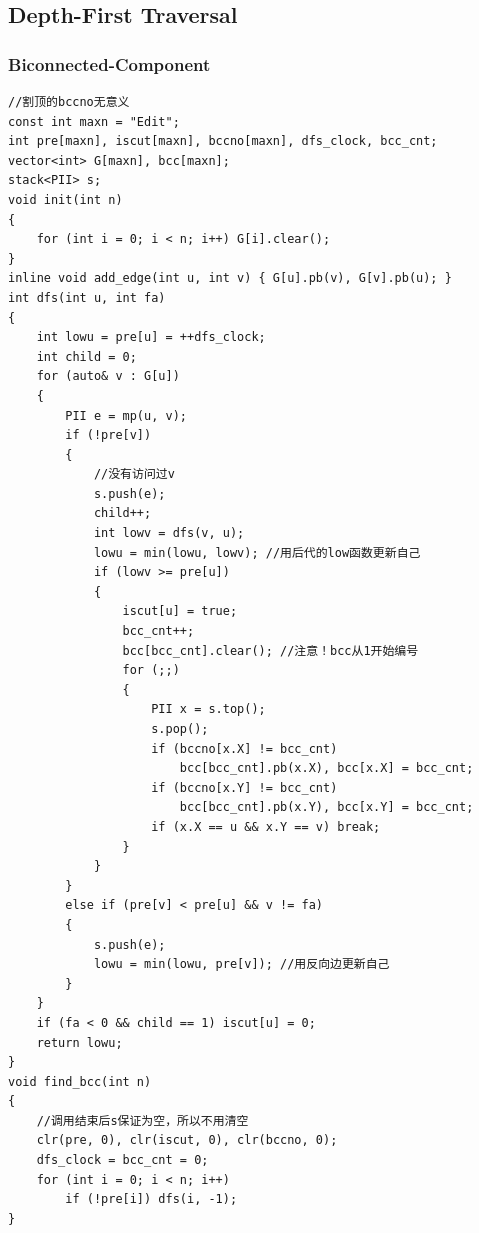 \documentclass[twoside]{article}
\begin{document}
\subsection{Depth-First Traversal}
\subsubsection{Biconnected-Component}
\begin{lstlisting}
//割顶的bccno无意义
const int maxn = "Edit";
int pre[maxn], iscut[maxn], bccno[maxn], dfs_clock, bcc_cnt;
vector<int> G[maxn], bcc[maxn];
stack<PII> s;
void init(int n)
{
    for (int i = 0; i < n; i++) G[i].clear();
}
inline void add_edge(int u, int v) { G[u].pb(v), G[v].pb(u); }
int dfs(int u, int fa)
{
    int lowu = pre[u] = ++dfs_clock;
    int child = 0;
    for (auto& v : G[u])
    {
        PII e = mp(u, v);
        if (!pre[v])
        {
            //没有访问过v
            s.push(e);
            child++;
            int lowv = dfs(v, u);
            lowu = min(lowu, lowv); //用后代的low函数更新自己
            if (lowv >= pre[u])
            {
                iscut[u] = true;
                bcc_cnt++;
                bcc[bcc_cnt].clear(); //注意！bcc从1开始编号
                for (;;)
                {
                    PII x = s.top();
                    s.pop();
                    if (bccno[x.X] != bcc_cnt)
                        bcc[bcc_cnt].pb(x.X), bcc[x.X] = bcc_cnt;
                    if (bccno[x.Y] != bcc_cnt)
                        bcc[bcc_cnt].pb(x.Y), bcc[x.Y] = bcc_cnt;
                    if (x.X == u && x.Y == v) break;
                }
            }
        }
        else if (pre[v] < pre[u] && v != fa)
        {
            s.push(e);
            lowu = min(lowu, pre[v]); //用反向边更新自己
        }
    }
    if (fa < 0 && child == 1) iscut[u] = 0;
    return lowu;
}
void find_bcc(int n)
{
    //调用结束后s保证为空，所以不用清空
    clr(pre, 0), clr(iscut, 0), clr(bccno, 0);
    dfs_clock = bcc_cnt = 0;
    for (int i = 0; i < n; i++)
        if (!pre[i]) dfs(i, -1);
}
\end{lstlisting}
\end{document}
